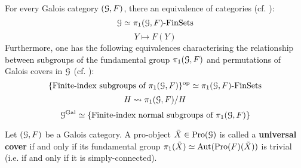             \begin{proposition} \label{prop: categorical_galois_correspondence}
                For every Galois category $(\mathcal{G}, F)$, there an equivalence of categories (cf. \cite[Propositions 5.2]{SGA1}):
                    $$\mathcal{G} \simeq \pi_1(\mathcal{G}, F)\text{-}\mathrm{Fin}\mathrm{Sets}$$
                    $$Y \mapsto F(Y)$$
                Furthermore, one has the following equivalences characterising the relationship between subgroups of the fundamental group $\pi_1(\mathcal{G}, F)$ and permutations of Galois covers in $\mathcal{G}$ (cf. \cite[Propositions 5.5]{SGA1}):
                    $$\{\text{Finite-index subgroups of $\pi_1(\mathcal{G}, F)$}\}^{\mathrm{op}} \simeq \pi_1(\mathcal{G}, F)\text{-}\mathrm{Fin}\mathrm{Sets}$$
                    $$H \leadsto \pi_1(\mathcal{G}, F)/H$$
                    $$\mathcal{G}^{\mathrm{Gal}} \simeq \{\text{Finite-index normal subgroups of $\pi_1(\mathcal{G}, F)$}\}$$
            \end{proposition}
                
            \begin{definition} \label{def: universal_covers}
                Let $(\mathcal{G}, F)$ be a Galois category. A pro-object $\tilde{X} \in \mathrm{Pro}(\mathcal{G})$ is called a \textbf{universal cover} if and only if its fundamental group $\pi_1(\tilde{X}) \simeq \mathrm{Aut}(\mathrm{Pro}(F)(\tilde{X}))$ is trivial (i.e. if and only if it is simply-connected).
            \end{definition}
            \begin{remark} \label{remark: fundamental_groups_are_automorphism_groups_of_universal_covers}
                
            \end{remark}
            
